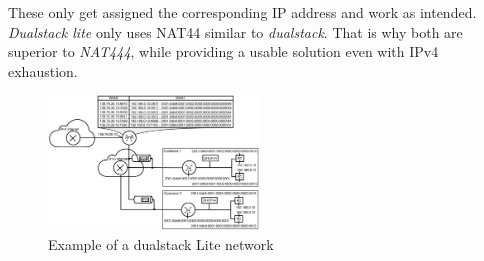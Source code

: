 \documentclass[format=sigconf, natbib=true, nonacm=true]{acmart}
\begin{document}
These only get assigned the corresponding IP address and work as intended. \textit{Dualstack lite} only uses NAT44 similar to \textit{dualstack}. That is why both are superior to \textit{NAT444}, while providing a usable solution even with IPv4 exhaustion\cite{Hughes2022_C08}.
    \begin{figure}
        \centering
        \includegraphics[width=0.5\textwidth]{images/dualstack_lite_network.png}
        \caption{Example of a dualstack Lite network}
        \label{fig:dualstack_lite_network}
    \end{figure}
\end{document}
